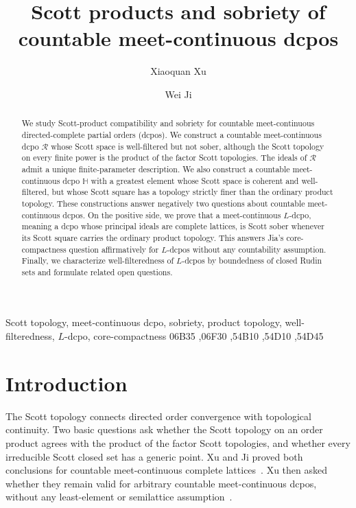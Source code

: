 \documentclass[fleqn,preprint,3p,a4paper]{elsarticle}
\theoremstyle{definition}
\newcommand{\HH}{\mathbb H}
\newcommand{\RR}{\mathcal R}
\begin{document}
\begin{frontmatter}

\title{Scott products and sobriety of countable meet-continuous dcpos}

\author[1]{Xiaoquan Xu}
\author[2]{Wei Ji}

\address[1]{School of Computer Information Engineering, Nanchang Institute of Technology, Nanchang 330044, China}
\address[2]{School of Mathematics and Statistics, Guilin University of Technology, Guilin 541004, China}


\begin{abstract}
We study Scott-product compatibility and sobriety for countable meet-continuous directed-complete partial orders (dcpos). We construct a countable meet-continuous dcpo $\RR$ whose Scott space is well-filtered but not sober, although the Scott topology on every finite power is the product of the factor Scott topologies. The ideals of $\RR$ admit a unique finite-parameter description. We also construct a countable meet-continuous dcpo $\HH$ with a greatest element whose Scott space is coherent and well-filtered, but whose Scott square has a topology strictly finer than the ordinary product topology. These constructions answer negatively two questions about countable meet-continuous dcpos. On the positive side, we prove that a meet-continuous $L$-dcpo, meaning a dcpo whose principal ideals are complete lattices, is Scott sober whenever its Scott square carries the ordinary product topology. This answers Jia's core-compactness question affirmatively for $L$-dcpos without any countability assumption. Finally, we characterize well-filteredness of $L$-dcpos by boundedness of closed Rudin sets and formulate related open questions.
\end{abstract}

\begin{keyword}
Scott topology, meet-continuous dcpo, sobriety, product topology, well-filteredness, $L$-dcpo, core-compactness
\MSC[2020] 06B35 \sep 06F30 \sep 54B10 \sep 54D10 \sep 54D45
\end{keyword}

\end{frontmatter}




\section{Introduction}\label{sec:intro}
The Scott topology connects directed order convergence with topological continuity. Two basic questions ask whether the Scott topology on an order product agrees with the product of the factor Scott topologies, and whether every irreducible Scott closed set has a generic point. Xu and Ji proved both conclusions for countable meet-continuous complete lattices~\cite[Theorem~1.1]{XuJi}. Xu then asked whether they remain valid for arbitrary countable meet-continuous dcpos, without any least-element or semilattice assumption~\cite[Questions~1.1 and~1.2]{Xu}.
\end{document}
